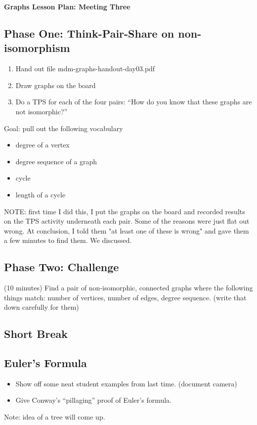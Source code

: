\documentclass[12pt]{amsart}
\theoremstyle{definition}
\begin{document}
\begin{center}
\textbf{\Huge
Graphs Lesson Plan: Meeting Three
}
\end{center}
\vspace{.5in}

\subsection*{Phase One: Think-Pair-Share on non-isomorphism}

\begin{enumerate}
\item Hand out file mdm-graphs-handout-day03.pdf
\item Draw graphs on the board
\item Do a TPS for each of the four pairs: ``How do you know that these graphs are not isomorphic?''
\end{enumerate}

Goal: pull out the following vocabulary
\begin{itemize}
\item degree of a vertex
\item degree sequence of a graph
\item cycle
\item length of a cycle
\end{itemize}

NOTE: first time I did this, I put the graphs on the board and recorded results on the TPS activity underneath each pair. Some of the reasons were just flat out wrong. At conclusion, I told them "at least one of these is wrong" and gave them a few minutes to find them. We discussed.

\subsection*{Phase Two: Challenge}

(10 minutes) Find a pair of non-isomorphic, connected graphs where the following things match: number of vertices, number of edges, degree sequence. (write that down carefully for them)

\subsection*{Short Break}

\subsection*{Euler's Formula}

\begin{itemize}
\item Show off some neat student examples from last time. (document camera)
\item Give Conway's ``pillaging'' proof of Euler's formula.
\end{itemize}

Note: idea of a tree will come up. 
\end{document}
